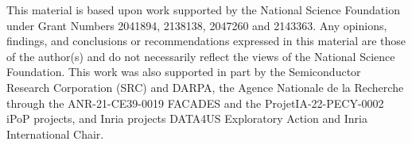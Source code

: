 This material is based upon work supported by the National Science Foundation
under Grant Numbers 
2041894, %
2138138, %
2047260 %
and
2143363. %
%
Any opinions, findings, and conclusions or
recommendations expressed in this material are those of the author(s) and do not
necessarily reflect the views of the National Science Foundation.
%
This work was also supported in part by the Semiconductor Research Corporation (SRC) and DARPA, %
%
the Agence Nationale de la Recherche through the ANR-21-CE39-0019 FACADES and the ProjetIA-22-PECY-0002 iPoP projects,  %
%
and Inria projects DATA4US Exploratory Action and Inria International Chair. %